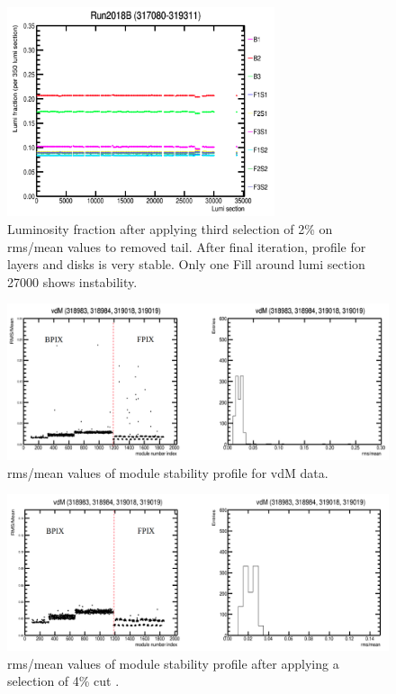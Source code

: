\begin{figure}[!htp]
\centering
\includegraphics[width=0.7\textwidth]{ashish_thesis/second_iteration_stability.png}
\caption{%
   Luminosity fraction after applying third selection of 2\% on rms/mean values to removed tail. After final iteration, profile for layers and disks is very stable. Only one Fill around lumi section 27000 shows instability.
}
\label{fig:sec_it_stability}
\end{figure}

\begin{figure}[!htp]
\centering
\includegraphics[width=1\textwidth]{ashish_thesis/vdm_rms_mean.png}
\caption{%
   rms/mean values of module stability profile for vdM data. 
}
\label{fig:vdm_cut}
\end{figure}


\begin{figure}[!htp]
\centering
\includegraphics[width=1\textwidth]{ashish_thesis/first_iteration_vdm.png}
\caption{%
   rms/mean values of module stability profile after applying a selection of 4\% cut . 
}
\label{fig:vdm_cut}
\end{figure}


